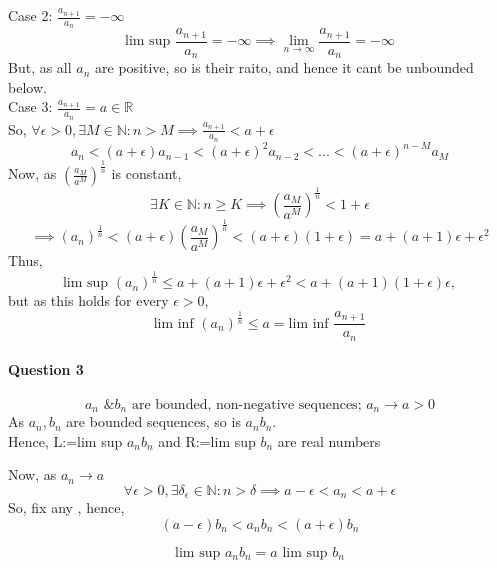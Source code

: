 \documentclass[20pt]{extarticle} %
\begin{document}
\begin{enumerate}[label=\Roman*]
		Case 2:  $ \frac{a_{n+1}}{a_n}= -\infty $\\
		\[ \text{lim sup }  \frac{a_{n+1}}{a_n}= -\infty \implies \lim_{n \to \infty} \frac{a_{n+1}}{a_n} = -\infty\]
		But, as all $a_n$ are positive, so is their raito, and hence it cant be unbounded below. \\

		Case 3:  $ \frac{a_{n+1}}{a_n}= a \in \mathbb{R} $\\
		So, $ \forall \epsilon > 0,  \exists M \in \mathbb{N}: n > M \implies \frac{a_{n+1}}{a_n} < a+\epsilon$
		\[ a_n<(a+\epsilon) a_{n-1}<(a+\epsilon)^2 a_{n-2}<...<(a+\epsilon)^{n-M} a_M \]
		Now, as $(\frac{a_M}{a^M})^{ \frac{1}{n} }$ is constant,
		\[   	\exists K \in \mathbb{N}: n \geq K \implies  (\frac{a_M}{a^M})^{ \frac{1}{n} } <1+\epsilon\]
		\[ \implies (a_n)^ \frac{1}{n}<(a+ \epsilon) (\frac{a_M}{a^M})^{ \frac{1}{n} } < (a+\epsilon)(1+\epsilon)=a+(a+1)\epsilon + \epsilon^2 \]
		Thus,
		\[\text{lim sup }(a_n)^ \frac{1}{n} \leq a+(a+1) \epsilon + \epsilon^2<a+(a+1)(1+\epsilon)\epsilon, \]
	but as this holds for every $\epsilon>0$,
		\[ \text{lim inf }(a_n)^ \frac{1}{n} \leq a= \text{lim inf } \frac{a_{n+1}}{a_n}  \]

\end{enumerate}

\paragraph{Question 3}
\[\text{ $a_n$ \& $b_n$ are bounded, non-negative sequences; $a_n \rightarrow a >0 $   } \]
As $a_n, b_n $ are bounded sequences, so is $a_n b_n$.\\
Hence, L:=lim sup $a_n b_n $ and R:=lim sup $b_n$ are real numbers

Now, as $a_n \rightarrow a$
\[ \forall \epsilon > 0, \exists \delta_\epsilon \in \mathbb{N}:n>\delta \implies a-\epsilon < a_n < a + \epsilon   \]
So, fix any \epsilon, hence,
\[ (a- \epsilon)b_n < a_n b_n < (a+ \epsilon)b_n \]

\[ \text{lim sup }a_n b_n = a \text{ lim sup }b_n \]
\end{document}

